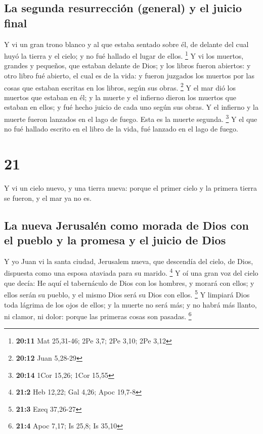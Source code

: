 \hypertarget{la-segunda-resurrecciuxf3n-general-y-el-juicio-final}{%
\subsection{La segunda resurrección (general) y el juicio
final}\label{la-segunda-resurrecciuxf3n-general-y-el-juicio-final}}

 Y vi un gran trono blanco y al que estaba sentado sobre
él, de delante del cual huyó la tierra y el cielo; y no fué hallado el
lugar de ellos. \footnote{\textbf{20:11} Mat 25,31-46; 2Pe 3,7; 2Pe
  3,10; 2Pe 3,12}  Y vi los muertos, grandes y pequeños,
que estaban delante de Dios; y los libros fueron abiertos: y otro libro
fué abierto, el cual es de la vida: y fueron juzgados los muertos por
las cosas que estaban escritas en los libros, según sus obras.
\footnote{\textbf{20:12} Juan 5,28-29}  Y el mar dió los
muertos que estaban en él; y la muerte y el infierno dieron los muertos
que estaban en ellos; y fué hecho juicio de cada uno según sus obras.
 Y el infierno y la muerte fueron lanzados en el lago de
fuego. Esta es la muerte segunda. \footnote{\textbf{20:14} 1Cor 15,26;
  1Cor 15,55}  Y el que no fué hallado escrito en el
libro de la vida, fué lanzado en el lago de fuego.

\hypertarget{section-20}{%
\section{21}\label{section-20}}

 Y vi un cielo nuevo, y una tierra nueva: porque el primer
cielo y la primera tierra se fueron, y el mar ya no es.

\hypertarget{la-nueva-jerusaluxe9n-como-morada-de-dios-con-el-pueblo-y-la-promesa-y-el-juicio-de-dios}{%
\subsection{La nueva Jerusalén como morada de Dios con el pueblo y la
promesa y el juicio de
Dios}\label{la-nueva-jerusaluxe9n-como-morada-de-dios-con-el-pueblo-y-la-promesa-y-el-juicio-de-dios}}

 Y yo Juan vi la santa ciudad, Jerusalem nueva, que
descendía del cielo, de Dios, dispuesta como una esposa ataviada para su
marido. \footnote{\textbf{21:2} Heb 12,22; Gal 4,26; Apoc 19,7-8}
 Y oí una gran voz del cielo que decía: He aquí el
tabernáculo de Dios con los hombres, y morará con ellos; y ellos serán
su pueblo, y el mismo Dios será su Dios con ellos. \footnote{\textbf{21:3}
  Ezeq 37,26-27}  Y limpiará Dios toda lágrima de los ojos
de ellos; y la muerte no será más; y no habrá más llanto, ni clamor, ni
dolor: porque las primeras cosas son pasadas. \footnote{\textbf{21:4}
  Apoc 7,17; Is 25,8; Is 35,10}

